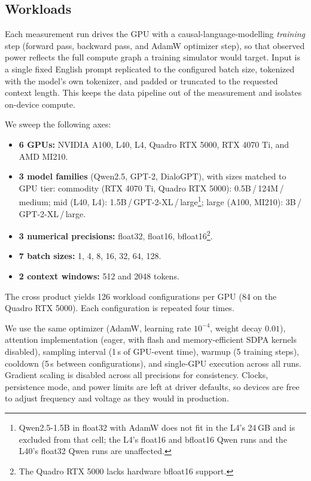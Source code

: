 \documentclass[10pt,conference,letterpaper]{IEEEtran}
\begin{document}
\subsection{Workloads}\label{sec:workloads}
Each measurement run drives the GPU with a causal-language-modelling \emph{training} step (forward pass, backward pass, and AdamW optimizer step), so that observed power reflects the full compute graph a training simulator would target.
Input is a single fixed English prompt replicated to the configured batch size, tokenized with the model's own tokenizer, and padded or truncated to the requested context length.
This keeps the data pipeline out of the measurement and isolates on-device compute.

We sweep the following axes:
\begin{itemize}
    \item \textbf{6 GPUs:} NVIDIA A100, L40, L4, Quadro RTX 5000, RTX 4070 Ti, and AMD MI210.
    \item \textbf{3 model families} (Qwen2.5, GPT-2, DialoGPT), with sizes matched to GPU tier:
          commodity (RTX 4070 Ti, Quadro RTX 5000): 0.5B\,/\,124M\,/\,medium;
          mid (L40, L4): 1.5B\,/\,GPT-2-XL\,/\,large\footnote{Qwen2.5-1.5B in float32 with AdamW does not fit in the L4's 24\,GB and is excluded from that cell; the L4's float16 and bfloat16 Qwen runs and the L40's float32 Qwen runs are unaffected.};
          large (A100, MI210): 3B\,/\,GPT-2-XL\,/\,large.
    \item \textbf{3 numerical precisions:} float32, float16, bfloat16\footnote{The Quadro RTX 5000 lacks hardware bfloat16 support.}.
    \item \textbf{7 batch sizes:} 1, 4, 8, 16, 32, 64, 128.
    \item \textbf{2 context windows:} 512 and 2048 tokens.
\end{itemize}
The cross product yields 126 workload configurations per GPU (84 on the Quadro RTX 5000).
Each configuration is repeated four times.

We use the same optimizer (AdamW, learning rate $10^{-4}$, weight decay $0.01$), attention implementation (eager, with flash and memory-efficient SDPA kernels disabled), sampling interval (1\,s of GPU-event time), warmup (5 training steps), cooldown (5\,s between configurations), and single-GPU execution across all runs.
Gradient scaling is disabled across all precisions for consistency.
Clocks, persistence mode, and power limits are left at driver defaults, so devices are free to adjust frequency and voltage as they would in production.
\end{document}
